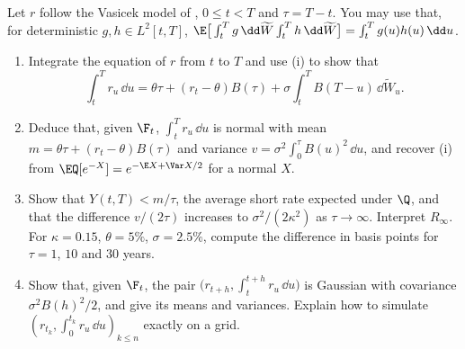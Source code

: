 \begin{exercise}\label{ex:ir-vasicek-gaussian}
\medium Let $r$ follow the Vasicek model of , $0\le t<T$ and $\tau=T-t$. You
may use that, for deterministic $g,h\in L^2[t,T]$,
$\E\big[\int_t^Tg\,\dd\widetilde W\int_t^Th\,\dd\widetilde W\big]=\int_t^Tg(u)h(u)\,\dd u$.
\begin{enumerate}[label=(\alph*)]
  \item Integrate the equation of $r$ from $t$ to $T$ and use (i) to show that
    \[
      \int_t^Tr_u\,\dd u=\theta\tau+(r_t-\theta)B(\tau)+\sigma\int_t^TB(T-u)\,\dd\widetilde W_u .
    \]
  \item Deduce that, given $\F_t$, $\int_t^Tr_u\,\dd u$ is normal with mean
    $m=\theta\tau+(r_t-\theta)B(\tau)$ and variance $v=\sigma^2\int_0^\tau B(u)^2\,\dd u$, and recover
    (i) from $\EQ[e^{-X}]=e^{-\E X+\Var X/2}$ for a normal $X$.
  \item Show that $Y(t,T)<m/\tau$, the average short rate expected under $\Q$, and that the difference
    $v/(2\tau)$ increases to $\sigma^2/(2\kappa^2)$ as $\tau\to\infty$. Interpret $R_\infty$. For
    $\kappa=0.15$, $\theta=5\%$, $\sigma=2.5\%$, compute the difference in basis points for $\tau=1$, $10$
    and $30$ years.
  \item Show that, given $\F_t$, the pair $\big(r_{t+h},\int_t^{t+h}r_u\,\dd u\big)$ is Gaussian with
    covariance $\sigma^2B(h)^2/2$, and give its means and variances. Explain how to simulate
    $(r_{t_k},\int_0^{t_k}r_u\,\dd u)_{k\le n}$ exactly on a grid.
\end{enumerate}
\end{exercise}

